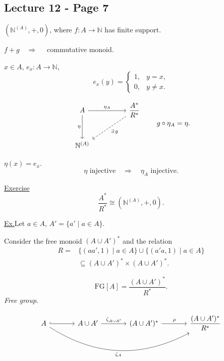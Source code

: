 
\subsection*{Lecture 12 - Page 7}

\noindent $(\mathbb{N}^{(A)},+,0)$, where
$f:A\longrightarrow\mathbb{N}$ has finite support.

\medskip
\noindent $f+g\quad\Longrightarrow\quad$ commutative monoid.

\bigskip
\noindent $x\in A$, \quad $e_x:A\longrightarrow\mathbb{N}$,
\[
e_x(y)=
\begin{cases}
1, & y=x,\\
0, & y\neq x.
\end{cases}
\]

\[
\begin{tikzcd}[column sep=huge, row sep=large]
A \arrow[r,"\eta_A"] \arrow[d,"\eta"']
  & \dfrac{A^*}{R^*} \arrow[dl,dashed,"{\exists\,g}"]\\
\mathbb{N}^{(A)} &
\end{tikzcd}
\qquad g\circ\eta_A=\eta.
\]

\noindent $\eta(x)=e_x$.
\[
\eta\text{ injective}\quad\Longrightarrow\quad
\eta_A\text{ injective}.
\]

\medskip
\noindent\underline{Exercise}
\[
\frac{A^*}{R^*}\cong(\mathbb{N}^{(A)},+,0).
\]

\bigskip
\noindent\underline{Ex.}\quad Let $a\in A$,
$A'=\{a'\mid a\in A\}$.

\medskip
\noindent Consider the free monoid $(A\cup A')^*$
and the relation
\[
\begin{aligned}
R={}&\{(aa',1)\mid a\in A\}
  \cup\{(a'a,1)\mid a\in A\}\\
&\subseteq (A\cup A')^*\times(A\cup A')^*.
\end{aligned}
\]

\[
\mathrm{FG}[A]=\frac{(A\cup A')^*}{R^*}.
\]
\noindent\textit{Free group}.

\medskip
\[
\begin{tikzcd}[column sep=large, row sep=large]
A \arrow[r,hook] \arrow[rrr,bend right=30,"\zeta_A"']
& A\cup A' \arrow[r,"\zeta_{A\cup A'}"]
& (A\cup A')^* \arrow[r,"\rho"]
& \dfrac{(A\cup A')^*}{R^*}
\end{tikzcd}
\]
